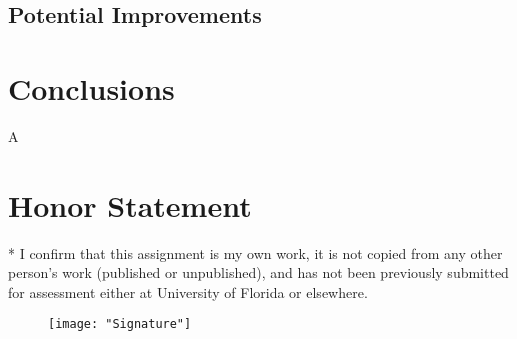 \documentclass[conference]{IEEEtran}
\begin{document}
\subsection{Potential Improvements}



\section{Conclusions} \label{Conclusions}
A

\section*{Honor Statement}
\noindent
* I confirm that this assignment is my own work, it is not copied from any other person's work (published or unpublished), and has not been previously submitted for assessment either at University of Florida or elsewhere.

\begin{figure}[h!]
	\centering
	\texttt{[image: "Signature"]}
\end{figure}


\newpage



%
\end{document}
